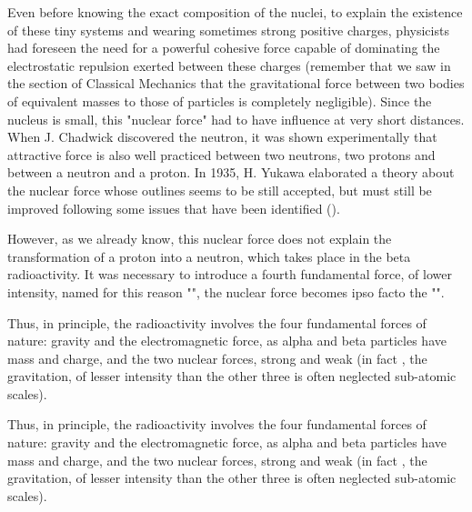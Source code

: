 	
	Even before knowing the exact composition of the nuclei, to explain the existence of these tiny systems and wearing sometimes strong positive charges, physicists had foreseen the need for a powerful cohesive force capable of dominating the electrostatic repulsion exerted between these charges (remember that we saw in the section of Classical Mechanics that the gravitational force between two bodies of equivalent masses to those of particles is completely negligible). Since the nucleus is small, this "nuclear force" had to have influence at very short distances. When J. Chadwick discovered the neutron, it was shown experimentally that attractive force is also well practiced between two neutrons, two protons and between a neutron and a proton. In 1935, H. Yukawa elaborated a theory about the nuclear force whose outlines seems to be still accepted, but must still be improved following some issues that have been identified ().
	
	However, as we already know, this nuclear force does not explain the transformation of a proton into a neutron, which takes place in the beta radioactivity. It was necessary to introduce a fourth fundamental force, of lower intensity, named for this reason "", the nuclear force becomes ipso facto the "".
	
	Thus, in principle, the radioactivity involves the four fundamental forces of nature: gravity and the electromagnetic force, as alpha and beta particles have mass and charge, and the two nuclear forces, strong and weak (in fact , the gravitation, of lesser intensity than the other three is often neglected  sub-atomic scales).
	
	Thus, in principle, the radioactivity involves the four fundamental forces of nature: gravity and the electromagnetic force, as alpha and beta particles have mass and charge, and the two nuclear forces, strong and weak (in fact , the gravitation, of lesser intensity than the other three is often neglected  sub-atomic scales).
	
